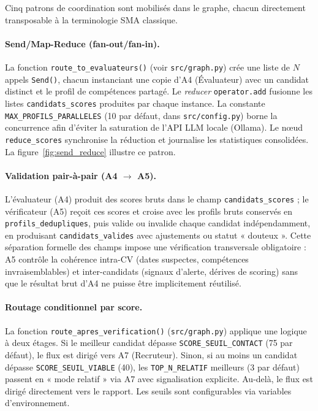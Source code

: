 Cinq patrons de coordination sont mobilisés dans le graphe, chacun directement transposable à la terminologie SMA classique.

\paragraph{Send/Map-Reduce (fan-out/fan-in).}
La fonction \texttt{route\_to\_evaluateurs()} (voir \texttt{src/graph.py}) crée une liste de $N$ appels \texttt{Send()}, chacun instanciant une copie d'A4 (Évaluateur) avec un candidat distinct et le profil de compétences partagé. Le \textit{reducer} \texttt{operator.add} fusionne les listes \texttt{candidats\_scores} produites par chaque instance. La constante \texttt{MAX\_PROFILS\_PARALLELES} (10 par défaut, dans \texttt{src/config.py}) borne la concurrence afin d'éviter la saturation de l'API LLM locale (Ollama). Le nœud \texttt{reduce\_scores} synchronise la réduction et journalise les statistiques consolidées. La figure~\ref{fig:send_reduce} illustre ce patron.



\paragraph{Validation pair-à-pair (A4 \(\rightarrow\) A5).}
L'évaluateur (A4) produit des scores bruts dans le champ \texttt{candidats\_scores} ; le vérificateur (A5) reçoit ces scores et croise avec les profils bruts conservés en \texttt{profils\_dedupliques}, puis valide ou invalide chaque candidat indépendamment, en produisant \texttt{candidats\_valides} avec ajustements ou statut « douteux ». Cette séparation formelle des champs impose une vérification transversale obligatoire : A5 contrôle la cohérence intra-CV (dates suspectes, compétences invraisemblables) et inter-candidats (signaux d'alerte, dérives de scoring) sans que le résultat brut d'A4 ne puisse être implicitement réutilisé.

\paragraph{Routage conditionnel par score.}
La fonction \texttt{route\_apres\_verification()} (\texttt{src/graph.py}) applique une logique à deux étages. Si le meilleur candidat dépasse \texttt{SCORE\_SEUIL\_CONTACT} (75 par défaut), le flux est dirigé vers A7 (Recruteur). Sinon, si au moins un candidat dépasse \texttt{SCORE\_SEUIL\_VIABLE} (40), les \texttt{TOP\_N\_RELATIF} meilleurs (3 par défaut) passent en « mode relatif » via A7 avec signalisation explicite. Au-delà, le flux est dirigé directement vers le rapport. Les seuils sont configurables via variables d'environnement.

